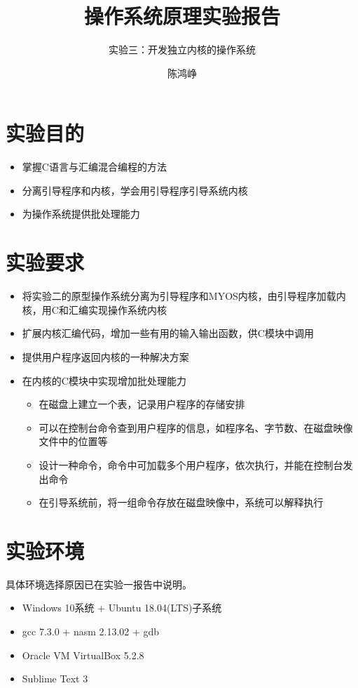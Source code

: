 \documentclass[logo,reportComp]{thesis}
\title{操作系统原理实验报告}
\subtitle{实验三：开发独立内核的操作系统}
\author{陈鸿峥}
\begin{document}
\maketitle

\section{实验目的}
\begin{itemize}
    \item 掌握C语言与汇编混合编程的方法
    \item 分离引导程序和内核，学会用引导程序引导系统内核
    \item 为操作系统提供批处理能力
\end{itemize}

\section{实验要求}
\begin{itemize}
    \item 将实验二的原型操作系统分离为引导程序和MYOS内核，由引导程序加载内核，用C和汇编实现操作系统内核
    \item 扩展内核汇编代码，增加一些有用的输入输出函数，供C模块中调用
    \item 提供用户程序返回内核的一种解决方案
    \item 在内核的C模块中实现增加批处理能力
    \begin{itemize}
        \item 在磁盘上建立一个表，记录用户程序的存储安排
        \item 可以在控制台命令查到用户程序的信息，如程序名、字节数、在磁盘映像文件中的位置等
        \item 设计一种命令，命令中可加载多个用户程序，依次执行，并能在控制台发出命令
        \item 在引导系统前，将一组命令存放在磁盘映像中，系统可以解释执行
    \end{itemize}
\end{itemize}

\section{实验环境}
具体环境选择原因已在实验一报告中说明。
\begin{itemize}
	\item Windows 10系统 + Ubuntu 18.04(LTS)子系统
	\item gcc 7.3.0 + nasm 2.13.02 + gdb
	\item Oracle VM VirtualBox 5.2.8
	\item Sublime Text 3
\end{itemize}
\end{document}
